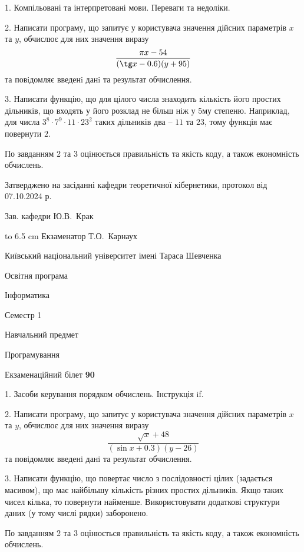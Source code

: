 \documentclass[12pt, ukrainian]{article}
\begin{document}
{%
1. Компільовані та інтерпретовані мови. Переваги та недоліки.%
\par
2. Написати програму, що запитує у користувача значення дійсних параметрів $x$ та $y$, обчислює для них значення виразу 
$$\frac{\pi x - 54}{(\tg x - 0.6) (y + 95)}$$ 
та повiдомляє введенi данi та результат обчислення.

\par
3. Написати функцію, що для цілого числа знаходить кількість його простих дільників, що входять у його розклад не більш ніж у 5му степеню. Наприклад, для числа $3^8{\cdot}7^9{\cdot}11{\cdot}23^{2}$ таких дільників два – $11$ та $23$, тому функція має повернути $2$.

По завданням 2 та 3 оцінюється правильність та якість коду, а також економність обчислень.

}
{\smallskip\smallskip \begin {scriptsize} Затверджено на засіданні кафедри теоретичної кібернетики, протокол   від   07.10.2024 р.\par\smallskip\smallskip\smallskip\smallskip
{\parbox {6.5 cm} {Зав. кафедри \dotfill Ю.В.~Крак}}\hspace {0.7cm} {\hbox to 6.5 cm { Екзаменатор \dotfill Т.О.~Карнаух}} \end{scriptsize}}
\vspace{0.9cm}
{{\begin {scriptsize}\par
{ \center  Київський національний університет імені Тараса Шевченка \par}
{\parbox {5 cm}{Освітня програма \hfill}{\parbox {7 cm}{Інформатика\hfill}}\parbox {6 cm}{\hfill Семестр 1}}\par
{\parbox {5 cm} {Навчальний предмет \hfill}\parbox {7 cm}{Програмування \hfill}\parbox {6cm}{\hfill}\par}\vspace{-15pt} \end{scriptsize}}{\center Екзаменаційний білет \No \textbf { 90 }\par}}
{%
1. Засоби керування порядком обчислень. Інструкція if.%
\par
2. Написати програму, що запитує у користувача значення дійсних параметрів $x$ та $y$, обчислює для них значення виразу 
$$\frac{\sqrt x + 48}{(\sin x + 0.3) (y - 26)}$$ 
та повiдомляє введенi данi та результат обчислення.

\par
3. Написати функцію, що повертає число з послідовності цілих (задається масивом), що має найбільшу кількість різних простих дільників. Якщо таких чисел кілька, то повернути найменше. Використовувати додаткові структури даних (у тому числі рядки) заборонено.

По завданням 2 та 3 оцінюється правильність та якість коду, а також економність обчислень.

}
\end{document}
